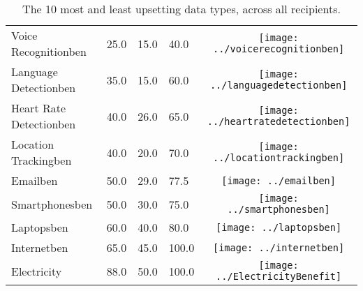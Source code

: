 \begin{table}[t]
\begin{center}
\begin{tabular}{| p{2cm} | p{1cm} | p{1cm} | p{1cm} | c |}
Voice Recognitionben & 25.0 & 15.0 & 40.0 & \texttt{[image: ../voicerecognitionben]} \\ 
Language Detectionben & 35.0 & 15.0 & 60.0 & \texttt{[image: ../languagedetectionben]} \\ 
Heart Rate Detectionben & 40.0 & 26.0 & 65.0 & \texttt{[image: ../heartratedetectionben]} \\ 
Location Trackingben & 40.0 & 20.0 & 70.0 & \texttt{[image: ../locationtrackingben]} \\ 
Emailben & 50.0 & 29.0 & 77.5 & \texttt{[image: ../emailben]} \\ 
Smartphonesben & 50.0 & 30.0 & 75.0 & \texttt{[image: ../smartphonesben]} \\ 
Laptopsben & 60.0 & 40.0 & 80.0 & \texttt{[image: ../laptopsben]} \\ 
Internetben & 65.0 & 45.0 & 100.0 & \texttt{[image: ../internetben]} \\ 
Electricity & 88.0 & 50.0 & 100.0 & \texttt{[image: ../ElectricityBenefit]} \\ 
\hline
\end{tabular}
\caption{The 10 most and least upsetting data types, across all recipients.}
\label{top10}
\end{center}
\end{table}

